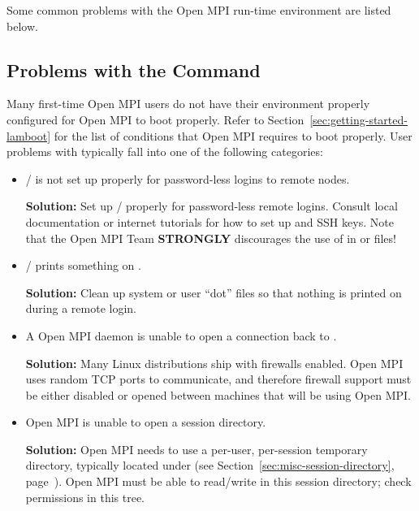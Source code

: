 Some common problems with the Open MPI run-time environment are listed
below.


\subsection{Problems with the  Command}

Many first-time Open MPI users do not have their environment properly
configured for Open MPI to boot properly.  Refer to
Section~\ref{sec:getting-started-lamboot} for the list of conditions
that Open MPI requires to boot properly.  User problems with 
typically fall into one of the following categories:

\begin{itemize}
\item {}/ is not set up properly for password-less
  logins to remote nodes.
  
  {\bf Solution:} Set up / properly for
  password-less remote logins.  Consult local documentation or
  internet tutorials for how to set up  and SSH
  keys.  Note that the Open MPI Team {\bf STRONGLY} discourages the use of
  \cmdarg{+} in  or  files!

\item {}/ prints something on .

  {\bf Solution:} Clean up system or user ``dot'' files so that
  nothing is printed on  during a remote login.

\item A Open MPI daemon is unable to open a connection back to
  .

  {\bf Solution:} Many Linux distributions ship with firewalls
  enabled.  Open MPI uses random TCP ports to communicate, and
  therefore firewall support must be either disabled or opened between
  machines that will be using Open MPI.

\item Open MPI is unable to open a session directory.
  
  {\bf Solution:} Open MPI needs to use a per-user, per-session temporary
  directory, typically located under  (see
  Section~\ref{sec:misc-session-directory},
  page~\pageref{sec:misc-session-directory}).  Open MPI must be able to
  read/write in this session directory; check permissions in this
  tree.


\end{itemize}
